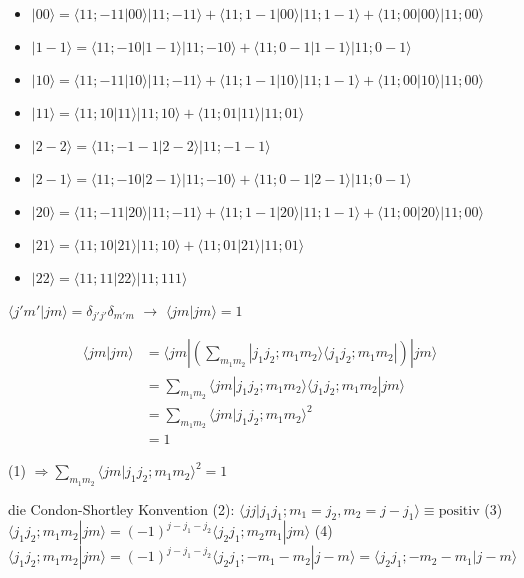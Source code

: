 \begin{itemize}
\item \(|00\rangle = \langle 11;-11|00\rangle|11;-11\rangle + \langle 11;1-1|00\rangle|11;1-1\rangle + \langle 11;00|00\rangle|11;00\rangle\)
\item \(|1-1\rangle =\langle 11;-10|1-1\rangle| 11;-10\rangle +\langle 11;0-1 |1-1\rangle |11;0-1 \rangle\)
\item \(|10\rangle = \langle 11;-11|10\rangle|11;-11\rangle +  \langle 11;1-1|10\rangle| 11;1-1\rangle+ \langle 11;00|10\rangle|11;00\rangle\)
\item \(|11\rangle = \langle 11;10 |11\rangle|11;10\rangle + \langle 11;01 |11\rangle|11;01\rangle\)
\item \(|2-2\rangle = \langle 11;-1-1|2-2\rangle|11;-1-1\rangle\)
\item \(|2 -1\rangle = \langle 11;-1 0 |2-1\rangle|11;-1 0\rangle + \langle 11;0-1|2-1\rangle|11;0-1\rangle\)
\item \(|2 0\rangle = \langle 11;-1 1 |20\rangle|11;-1 1\rangle+\langle11; 1-1 |20\rangle|11;1-1\rangle+\langle 11;00 |20\rangle|11;00\rangle\)
\item \(|21\rangle = \langle 11;10 |21\rangle|11;10\rangle+\langle 11; 01 |21\rangle|11;01\rangle\)
\item \(|22\rangle = \langle 11;11|22\rangle|11;111\rangle\)
\end{itemize}

\(\langle j'm'|jm\rangle = \delta_{j'j'}\delta_{m'm}\) \( \rightarrow\) \(\langle jm|jm\rangle = 1\)


\begin{align}
\langle jm |jm\rangle &= \langle jm|\left( \sum_{m_1m_2} |j_1j_2;m_1m_2\rangle \langle j_1j_2;m_1m_2|\right) |jm\rangle \\
 &= \sum_{m_1m_2}\langle jm|j_1j_2;m_1m_2\rangle \langle j_1j_2;m_1m_2|jm\rangle \\
&= \sum_{m_1m_2}\langle jm |j_1j_2;m_1m_2\rangle^2 \\
&=1
\end{align}

(1) \(\Rightarrow \sum_{m_1m_2} \langle jm |j_1j_2;m_1m_2\rangle^2 = 1\)

die Condon-Shortley Konvention (2): \(\langle jj|j_1j_1;m_1=j_2,m_2=j-j_1\rangle \equiv \text{positiv}\) (3) \(\langle j_1j_2;m_1m_2|jm\rangle = (-1)^{j-j_1-j_2}\langle j_2 j_1; m_2 m_1| j m\rangle\)
 (4) \[\langle j_1j_2;m_1m_2|jm\rangle = (-1)^{j-j_1-j_2}\langle j_2 j_1; -m_1 -m_2| j -m\rangle = \langle j_2 j_1; -m_2 -m_1| j -m\rangle \]

